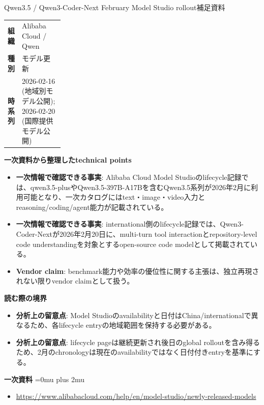 \begin{technicalnote}{Qwen3.5 / Qwen3-Coder-Next February Model Studio rollout}{補足資料}
\begingroup
\begin{tabularx}{\linewidth}{@{}>{\bfseries}p{0.22\linewidth}X@{}}
組織 & Alibaba Cloud / Qwen \\
種別 & モデル更新 \\
時系列 & 2026-02-16 (地域別モデル公開); 2026-02-20 (国際提供モデル公開) \\
\end{tabularx}
\smallskip
{\bfseries 一次資料から整理したtechnical points}
\begin{itemize}[leftmargin=1.5em,itemsep=0.35em]
\item \textbf{一次情報で確認できる事実}: Alibaba Cloud Model Studioのlifecycle記録では、qwen3.5-plusやQwen3.5-397B-A17Bを含むQwen3.5系列が2026年2月に利用可能となり、一次カタログにはtext・image・video入力とreasoning/coding/agent能力が記載されている。
\item \textbf{一次情報で確認できる事実}: international側のlifecycle記録では、Qwen3-Coder-Nextが2026年2月20日に、multi-turn tool interactionとrepository-level code understandingを対象とするopen-source code modelとして掲載されている。
\item \textbf{Vendor claim}: benchmark能力や効率の優位性に関する主張は、独立再現されない限りvendor claimとして扱う。
\end{itemize}
\begin{minipage}{\linewidth}
{\bfseries 読む際の境界}
\begin{itemize}[leftmargin=1.5em,itemsep=0.35em]
\item \textbf{分析上の留意点}: Model Studioのavailabilityと日付はChina/internationalで異なるため、各lifecycle entryの地域範囲を保持する必要がある。
\item \textbf{分析上の留意点}: lifecycle pageは継続更新され後日のglobal rolloutを含み得るため、2月のchronologyは現在のavailabilityではなく日付付きentryを基準にする。
\end{itemize}
\begin{samepage}
{\bfseries 一次資料}
\begingroup\sloppy
\Urlmuskip=0mu plus 2mu\relax
\begin{itemize}[leftmargin=1.5em,itemsep=0.25em]
\item {\scriptsize\url{https://www.alibabacloud.com/help/en/model-studio/newly-released-models}}
\end{itemize}
\endgroup
\end{samepage}
\end{minipage}
\endgroup
\end{technicalnote}
\medskip

